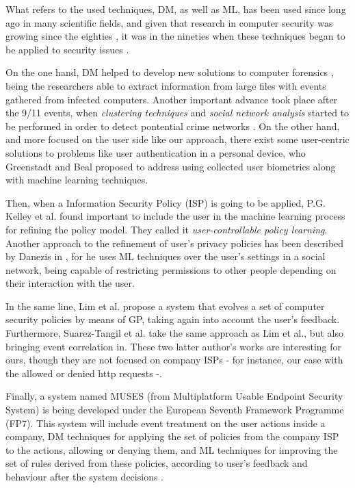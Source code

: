 \documentclass{llncs}
\begin{document}
What refers to the used techniques, DM, as well as ML, has been used since long ago in many scientific fields,
and given that research in computer security was growing since the
eighties \cite{computer_security_80}, it was in the nineties
when these techniques began to be applied to security issues
\cite{Clifton1996}. 

On the one hand, DM helped to develop new solutions to computer forensics \cite{DeVel2001}, being the researchers able to extract information from large files with events gathered from infected computers. Another important advance took place after the 9/11 events, when \textit{clustering techniques} and \textit{social network analysis} started to be performed in order to detect pontential crime networks \cite{Hsinchun2003}.
On the other hand, and more focused on the user side like our approach, there exist some user-centric solutions to problems like user authentication in a personal device, who Greenstadt and Beal \cite{cognitive_security_08} proposed to address using collected user biometrics along with machine learning techniques.
 
Then, when a Information Security Policy (ISP) is going to be applied, P.G. Kelley et al. \cite{user-controllable_learning_08} found important to include the user in the machine learning process for refining the policy model. They called it \textit{user-controllable policy learning}. Another approach to the refinement of user's privacy policies has been described by Danezis in \cite{inferring_policies_socialnetworks_09}, for he uses ML techniques over the user's settings in a social network, being capable of restricting permissions to other people depending on their interaction with the user.

In the same line, Lim et al. propose a system \cite{sec_policy_evolution_gp_08,pol_evol_gp_3_approaches_08} that evolves a set of computer security policies by means of GP, taking again into account the user's feedback. Furthermore, Suarez-Tangil et al. \cite{rule_generation_gp_09} take the same approach as Lim et al., but also bringing event correlation in. These two latter author's works are interesting for ours, though they are not focused on company ISPs - for instance, our case with the allowed or denied http requests -.

Finally, a system named MUSES (from Multiplatform Usable Endpoint
Security System) \cite{MUSES_SAC_14} is being developed under the
European Seventh Framework Programme (FP7). This system will include
event treatment on the user actions inside a company, DM techniques
for applying the set of policies from the company ISP to the actions,
allowing or denying them, and ML techniques for improving the set of
rules derived from these policies, according to user's feedback and
behaviour after the system decisions \cite{muses_sotics_13}.  
\end{document}

